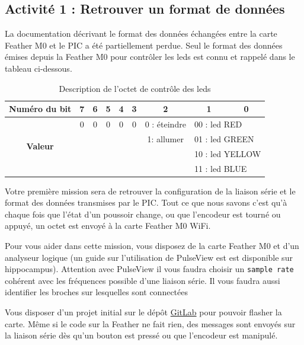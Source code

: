 \documentclass[11pt]{paper}
\begin{document}
\subsection*{Activité 1 : Retrouver un format de données}

La documentation décrivant le format des données échangées entre la carte Feather M0 et le PIC a été partiellement perdue. Seul le format des données émises depuis la Feather M0 pour contrôler les leds est connu et rappelé dans le tableau ci-dessous.

\begin{table}[htp]
\begin{center}
\begin{tabular}{|c|c|c|c|c|c|c|c|c|}
\hline
{\bf Numéro du bit}& 7 & 6 & 5 & 4 & 3 & 2 & 1 & 0\\
\hline
\multirow{4}{*}{\bf Valeur} & 0 & 0 & 0 & 0 & 0 & 0 : éteindre & \multicolumn{2}{|l|}{00 : led RED}\\
 & & & & & & 1: allumer  & \multicolumn{2}{|l|}{01 : led GREEN}\\
 & & & & & & & \multicolumn{2}{|l|}{10 : led YELLOW}\\
 & & & & & & & \multicolumn{2}{|l|}{11 : led BLUE}\\
\hline
\end{tabular}
\label{tab:leds}
\caption{Description de l'octet de contrôle des leds}
\end{center}
\end{table}%

Votre première mission sera de retrouver la configuration de la liaison série et le format des données transmises par le PIC. Tout ce que nous savons c'est qu'à chaque fois que l’état d’un poussoir change, ou que l’encodeur est tourné ou appuyé, un octet est envoyé à la carte Feather M0 WiFi. 

Pour vous aider dans cette mission, vous disposez de la carte Feather M0 et d'un analyseur logique (un guide sur l'utilisation de PulseView est est disponible sur hippocampus). Attention avec PulseView il vous faudra choisir un {\tt sample rate} cohérent avec les fréquences possible d'une liaison série. Il vous faudra aussi identifier les broches sur lesquelles sont connectées 

Vous disposer d'un projet initial sur le dépôt \href{https://gitlab.univ-nantes.fr/hladik-pe-1/ecn-sint-tp/-/tree/main/TP1-serie/code/tp1?ref_type=heads}{GitLab} pour pouvoir flasher la carte. Même si le code sur la Feather ne fait rien, des messages sont envoyés sur la liaison série dès qu'un bouton est pressé ou que l'encodeur est manipulé.
\end{document}
